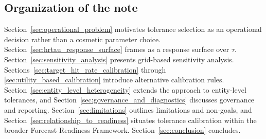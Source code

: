 \subsection{Organization of the note}
\label{subsec:organization}

Section~\ref{sec:operational_problem} motivates tolerance selection as an
operational decision rather than a cosmetic parameter choice.
Section~\ref{sec:hrtau_response_surface} frames \HRtau{} as a response surface
over \(\tau\).
Section~\ref{sec:sensitivity_analysis} presents grid-based sensitivity analysis.
Sections~\ref{sec:target_hit_rate_calibration} through
\ref{sec:utility_based_calibration} introduce alternative calibration rules.
Section~\ref{sec:entity_level_heterogeneity} extends the approach to entity-level
tolerances, and Section~\ref{sec:governance_and_diagnostics} discusses governance
and reporting.
Section~\ref{sec:limitations} outlines limitations and non-goals, and
Section~\ref{sec:relationship_to_readiness} situates tolerance calibration within
the broader Forecast Readiness Framework.
Section~\ref{sec:conclusion} concludes.
